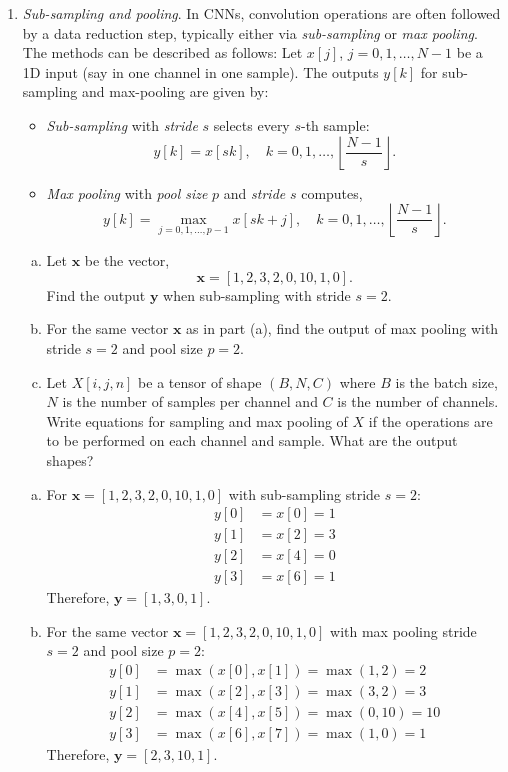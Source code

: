 \documentclass[11pt]{article}
\newcommand{\xbf}{\mathbf{x}}
\newcommand{\ybf}{\mathbf{y}}
\begin{document}
\begin{enumerate}
\item \emph{Sub-sampling and pooling}.
In CNNs, convolution operations are often followed
by a data reduction step, typically either via \emph{sub-sampling} or \emph{max pooling}.
The methods can be described as follows:
Let $x[j]$, $j=0,1,\ldots,N-1$ be a 1D input (say in one channel in one sample).
The outputs $y[k]$ for sub-sampling and max-pooling are given by:
\begin{itemize}
\item \emph{Sub-sampling} with \emph{stride} $s$ selects every $s$-th sample:
\[
    y[k] = x[sk], \quad k=0,1,\ldots, \left\lfloor \frac{N-1}{s} \right\rfloor.
\]
\item \emph{Max pooling} with \emph{pool size} $p$ and \emph{stride} $s$ computes,
\[
    y[k] = \max_{j=0,1,\ldots,p-1} x[sk+j], \quad  k=0,1,\ldots, \left\lfloor \frac{N-1}{s} \right\rfloor.
\]
\end{itemize}
\begin{enumerate}[(a)]
\item Let $\xbf$ be the vector,
\[
    \xbf = [1,2,3,2,0,10,1,0].
\]
Find the output $\ybf$ when sub-sampling with stride $s=2$.

\item For the same vector $\xbf$ as in part (a), find the output of max pooling with
stride $s=2$ and pool size $p=2$.

\item Let $X[i,j,n]$ be a tensor of shape $(B,N,C)$ where $B$ is the batch size,
$N$ is the number of samples per channel and $C$ is the number of channels.
Write equations for sampling and max pooling of $X$ if the operations are to be
performed on each channel and sample.  What are the output shapes?

\end{enumerate}

\begin{solution}
\begin{enumerate}[(a)]
\item For $\xbf = [1,2,3,2,0,10,1,0]$ with sub-sampling stride $s=2$:
\begin{align*}
y[0] &= x[0] = 1 \\
y[1] &= x[2] = 3 \\
y[2] &= x[4] = 0 \\
y[3] &= x[6] = 1
\end{align*}
Therefore, $\ybf = [1,3,0,1]$.

\item For the same vector $\xbf = [1,2,3,2,0,10,1,0]$ with max pooling stride $s=2$ and pool size $p=2$:
\begin{align*}
y[0] &= \max(x[0], x[1]) = \max(1,2) = 2 \\
y[1] &= \max(x[2], x[3]) = \max(3,2) = 3 \\
y[2] &= \max(x[4], x[5]) = \max(0,10) = 10 \\
y[3] &= \max(x[6], x[7]) = \max(1,0) = 1
\end{align*}
Therefore, $\ybf = [2,3,10,1]$.


\end{enumerate}
\end{solution}
\end{enumerate}
\end{document}
